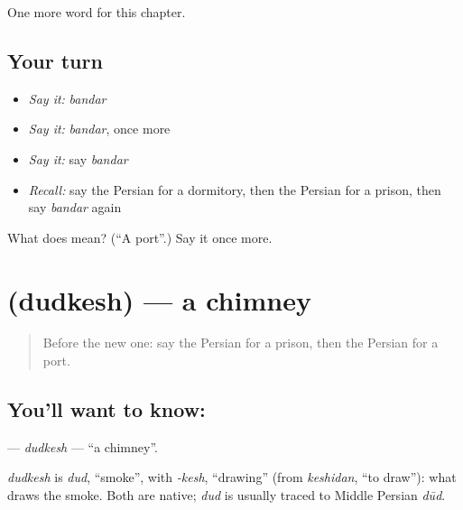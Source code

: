 \begin{grammarlens}[title={What you've built}]
One more word for this chapter.
\end{grammarlens}

\subsection*{Your turn}
\begin{itemize}
\raggedright
  \item \emph{Say it:} \emph{bandar}
  \item \emph{Say it:} \emph{bandar}, once more
  \item \emph{Say it:} say \emph{bandar}
  \item \emph{Recall:} say the Persian for a dormitory, then the Persian for a prison, then say \emph{bandar} again
\end{itemize}

\begin{tcolorbox}[breakable,colback=teal!4,colframe=teal!35!black,title={Before you move on}]
What does  mean? (\textquotedblleft{}A port\textquotedblright{}.) Say it once more.
\end{tcolorbox}
\section[\texorpdfstring{\fa{دودکش} (dudkesh)}{دودکش (dudkesh)}]{ (dudkesh) — a chimney}

\label{lesson:FA-C157-dudkesh}



\begin{quote}
Before the new one: say the Persian for a prison, then the Persian for a port.
\end{quote}

\subsection*{You'll want to know: }
\textbf{} — \emph{dudkesh} — \textquotedblleft{}a chimney\textquotedblright{}.

\begin{cousinweb}
\emph{dudkesh} is \emph{dud}, \textquotedblleft{}smoke\textquotedblright{}, with \emph{-kesh}, \textquotedblleft{}drawing\textquotedblright{} (from \emph{keshidan}, \textquotedblleft{}to draw\textquotedblright{}): what draws the smoke. Both are native; \emph{dud} is usually traced to Middle Persian \emph{dūd}.
\end{cousinweb}

